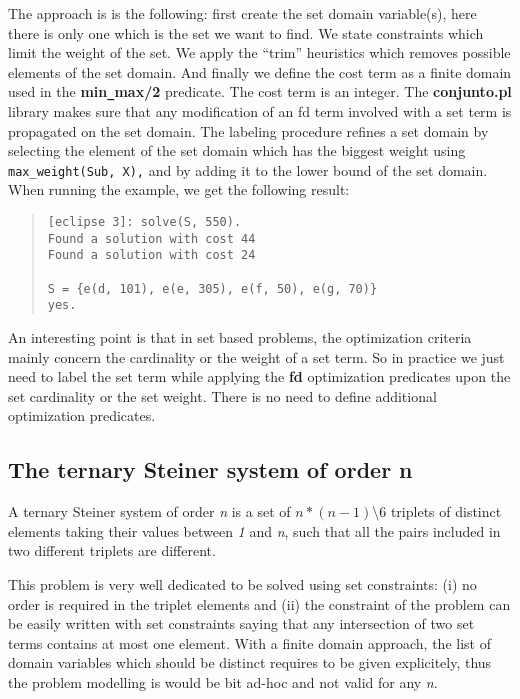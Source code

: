 The approach is is the following: first create the set domain
variable(s), here there is only one which is the set we want to find.
We state constraints which limit the weight of the set. We apply the
``trim'' heuristics which removes possible elements of the set domain.
And finally we define the cost term as a finite domain used in the
{\bf min\verb/_/max/2} predicate. The cost term is an integer. The
{\bf conjunto.pl} library makes sure that any modification of an fd
term involved with a set term is propagated on the set domain. The
labeling procedure refines a set domain by selecting the element of
the set domain which has the biggest weight using
\verb/max_weight(Sub, X),/ and by adding it to the lower bound of the set
domain. When running the example, we get the following result:
\begin{quote}\begin{verbatim}
[eclipse 3]: solve(S, 550).
Found a solution with cost 44
Found a solution with cost 24

S = {e(d, 101), e(e, 305), e(f, 50), e(g, 70)}
yes.
\end{verbatim}\end{quote}
An interesting point is that in set based problems, the optimization
criteria mainly concern the cardinality or the weight of a set term.
So in practice we just need to label the set term while applying the
{\bf fd} optimization predicates upon the set cardinality or the set
weight. There is no need to define additional optimization predicates.

\subsection{The ternary Steiner system of order n}
A ternary Steiner system of order {\em n} is a set of 
$n * (n-1) \setminus 6$
triplets of distinct elements taking their values between {\em 1} and
{\em n}, such that all the pairs included in two different triplets are
different. 

This problem is very well dedicated to be solved using set
constraints:  (i) no order is required in the triplet
elements and (ii) the constraint of the problem can be easily written
with set constraints saying that any intersection of two set terms
contains at most one element. With a finite domain approach,  the list of 
domain variables which should be distinct requires to be given
explicitely, thus the problem modelling is would be bit ad-hoc and not valid
for any {\em n}.

